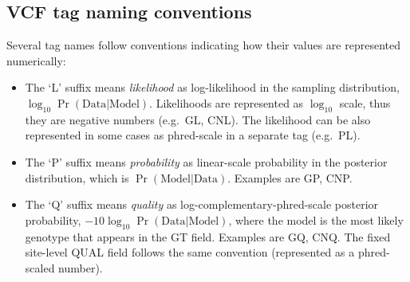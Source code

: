 \documentclass[8pt]{article}
\begin{document}
\subsection{VCF tag naming conventions}
Several tag names follow conventions indicating how their values are represented numerically:
\begin{itemize}
    \item The `L' suffix means \emph{likelihood} as log-likelihood in the sampling distribution, $\log_{10} \Pr(\mathrm{Data}|\mathrm{Model})$.
    Likelihoods are represented as $\log_{10}$ scale, thus they are negative numbers (e.g.\ GL, CNL).
    The likelihood can be also represented in some cases as phred-scale in a separate tag (e.g.\ PL).

    \item The `P' suffix means \emph{probability} as linear-scale probability in the posterior distribution, which is $\Pr(\mathrm{Model}|\mathrm{Data})$. Examples are GP, CNP.

    \item The `Q' suffix means \emph{quality} as log-complementary-phred-scale posterior probability, $-10 \log_{10} \Pr(\mathrm{Data}|\mathrm{Model})$, where the model is the most likely genotype that appears in the GT field.
    Examples are GQ, CNQ.
    The fixed site-level QUAL field follows the same convention (represented as a phred-scaled number).
\end{itemize}
\end{document}
